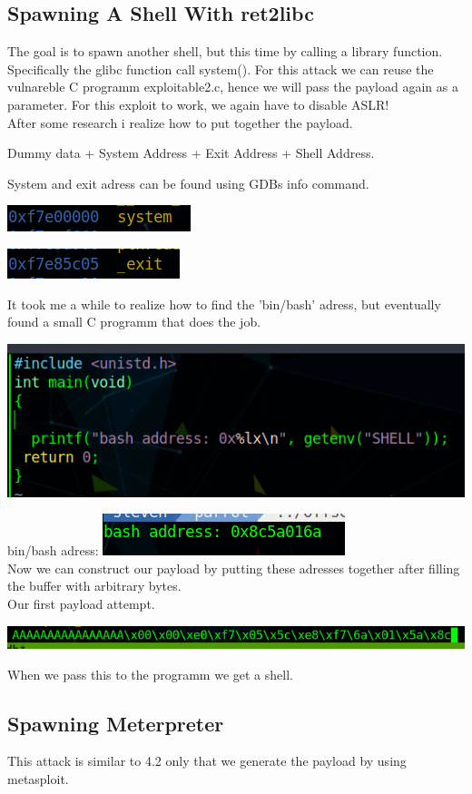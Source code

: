 \documentclass[a4paper,10pt]{article}
\begin{document}
\subsection{Spawning A Shell With ret2libc}
The goal is to spawn another shell, but this time by calling a library function.
Specifically the glibc function call system(). For this attack we can reuse the vulnareble C programm exploitable2.c, hence we will pass the payload again as a parameter.
For this exploit to work, we again have to disable ASLR!\\
After some research i realize how to put together the payload.
\begin{center}
 Dummy data + System Address + Exit Address + Shell Address.\\

\end{center}
System and exit adress can be found using GDBs info command.
\begin{center}
 \includegraphics[scale=0.5]{system.png}
\end{center}
\begin{center}
 \includegraphics[scale=0.5]{exit.png}
\end{center}
It took me a while to realize how to find the 'bin/bash' adress, but eventually found a small C programm that does the job.
\begin{center}
\includegraphics[scale=0.5]{basha.png}

\end{center}
bin/bash adress: 
\includegraphics[scale=0.5]{bash.png}\\
Now we can construct our payload by putting these adresses together after filling the buffer with arbitrary bytes.\\
Our first payload attempt.
\begin{center}
\includegraphics[scale=0.5]{pay.png} 
\end{center}
When we pass this to the programm we get a shell.

\newpage
\subsection{Spawning Meterpreter}
This attack is similar to 4.2 only that we generate the payload by using metasploit.
\end{document}

